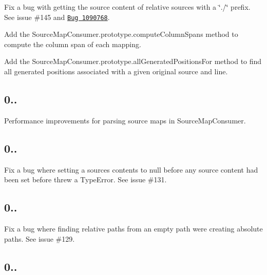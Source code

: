 \begin{DoxyItemize}
\item Fix a bug with getting the source content of relative sources with a \char`\"{}./\char`\"{} prefix. See issue \#145 and \href{bugzil.la/1090768}{\tt Bug 1090768}.
\item Add the {\ttfamily Source\+Map\+Consumer.\+prototype.\+compute\+Column\+Spans} method to compute the column span of each mapping.
\item Add the {\ttfamily Source\+Map\+Consumer.\+prototype.\+all\+Generated\+Positions\+For} method to find all generated positions associated with a given original source and line.
\end{DoxyItemize}

\subsection*{0..}


\begin{DoxyItemize}
\item Performance improvements for parsing source maps in Source\+Map\+Consumer.
\end{DoxyItemize}

\subsection*{0..}


\begin{DoxyItemize}
\item Fix a bug where setting a source\textquotesingle{}s contents to null before any source content had been set before threw a Type\+Error. See issue \#131.
\end{DoxyItemize}

\subsection*{0..}


\begin{DoxyItemize}
\item Fix a bug where finding relative paths from an empty path were creating absolute paths. See issue \#129.
\end{DoxyItemize}

\subsection*{0..}


